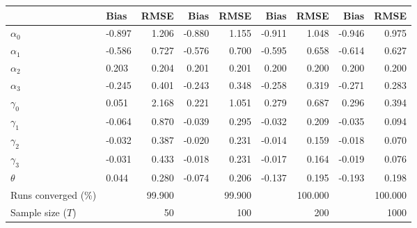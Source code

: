 
\begin{tabular}[t]{llrrrrrrr}
\toprule
  & Bias & RMSE & Bias & RMSE & Bias & RMSE & Bias & RMSE\\
\midrule
$\alpha_{0}$ & -0.897 & 1.206 & -0.880 & 1.155 & -0.911 & 1.048 & -0.946 & 0.975\\
$\alpha_{1}$ & -0.586 & 0.727 & -0.576 & 0.700 & -0.595 & 0.658 & -0.614 & 0.627\\
$\alpha_{2}$ & 0.203 & 0.204 & 0.201 & 0.201 & 0.200 & 0.200 & 0.200 & 0.200\\
$\alpha_{3}$ & -0.245 & 0.401 & -0.243 & 0.348 & -0.258 & 0.319 & -0.271 & 0.283\\
$\gamma_{0}$ & 0.051 & 2.168 & 0.221 & 1.051 & 0.279 & 0.687 & 0.296 & 0.394\\
$\gamma_{1}$ & -0.064 & 0.870 & -0.039 & 0.295 & -0.032 & 0.209 & -0.035 & 0.094\\
$\gamma_{2}$ & -0.032 & 0.387 & -0.020 & 0.231 & -0.014 & 0.159 & -0.018 & 0.070\\
$\gamma_{3}$ & -0.031 & 0.433 & -0.018 & 0.231 & -0.017 & 0.164 & -0.019 & 0.076\\
$\theta$ & 0.044 & 0.280 & -0.074 & 0.206 & -0.137 & 0.195 & -0.193 & 0.198\\
Runs converged (\%) &  & 99.900 &  & 99.900 &  & 100.000 &  & 100.000\\
Sample size ($T$) &  & 50 &  & 100 &  & 200 &  & 1000\\
\bottomrule
\end{tabular}
